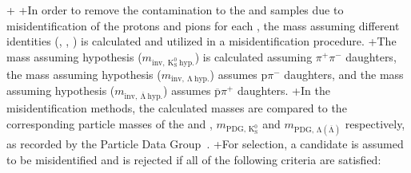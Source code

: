 +
+In order to remove the contamination to the \LamALam and \Ks samples due to misidentification of the protons and pions for each \Vz, the mass assuming different identities (\Lam, \ALam, \Ks) is calculated and utilized in a misidentification procedure.
+The mass assuming \Ks hypothesis ($m_{\mathrm{inv,~ K^{0}_{S}~ hyp.}}$) is calculated assuming $\pi^{+}\pi^{-}$ daughters, the mass assuming \Lam hypothesis ($m_{\mathrm{inv,~ \Lambda~ hyp.}}$) assumes p$\pi^{-}$ daughters, and the mass assuming \ALam hypothesis ($m_{\mathrm{inv,~ \overline{\Lambda}~ hyp.}}$) assumes $\overline{\mathrm{p}}\pi^{+}$ daughters. 
+In the misidentification methods, the calculated masses are compared to the corresponding particle masses of the \Ks and \LamALam, $m_{\mathrm{PDG,\,K^{0}_{S}}}$ and $m_{\mathrm{PDG,\,\Lambda(\overline{\Lambda})}}$ respectively, as recorded by the Particle Data Group~\cite{PhysRevD.98.030001}.
+For \LamALam selection, a candidate is assumed to be misidentified and is rejected if all of the following criteria are satisfied:
 
